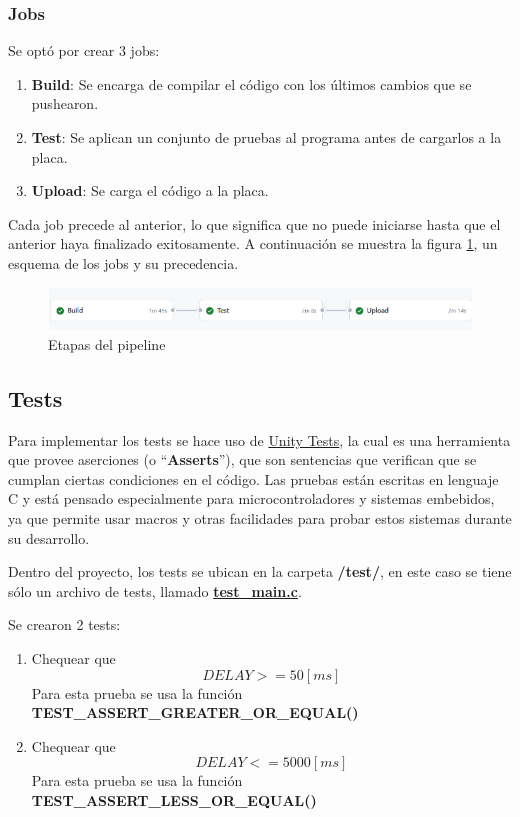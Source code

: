 \subsubsection{Jobs}
Se optó por crear 3 jobs:
\begin{enumerate}
\item \textbf{Build}: Se encarga de compilar el código con los últimos cambios que se pushearon.
\item \textbf{Test}: Se aplican un conjunto de pruebas al programa antes de cargarlos a la placa.
\item \textbf{Upload}: Se carga el código a la placa.
\end{enumerate}

Cada job precede al anterior, lo que significa que no puede iniciarse hasta que el anterior haya finalizado exitosamente. A continuación se muestra la figura \ref{fig:pipeline3}, un esquema de los jobs y su precedencia.

\begin{figure}[H]
    \centering
    \includegraphics[width=1\textwidth]{fig/pipeline_log.png}
    \caption{Etapas del pipeline}
    \label{fig:pipeline3}
\end{figure}
\subsection{Tests}
Para implementar los tests se hace uso de \href{http://www.throwtheswitch.org/unity}{Unity Tests}, la cual es una herramienta que provee aserciones (o ``\textbf{Asserts}''), que son sentencias que verifican que se cumplan ciertas condiciones en el código. Las pruebas están escritas en lenguaje C y está pensado especialmente para microcontroladores y sistemas embebidos, ya que permite usar macros y otras facilidades para probar estos sistemas durante su desarrollo.

Dentro del proyecto, los tests se ubican en la carpeta \textbf{/test/}, en este caso se tiene sólo un archivo de tests, llamado \href{https://github.com/FeedehC/pipeline-esp32/blob/main/test/test_main.c}{\textbf{test\_main.c}}.

Se crearon 2 tests:
\begin{enumerate}
\item Chequear que $$DELAY >= 50 [ms] $$
Para esta prueba se usa la función \textbf{TEST\_ASSERT\_GREATER\_OR\_EQUAL()}
\item Chequear que $$ DELAY <= 5000 [ms] $$
Para esta prueba se usa la función \textbf{TEST\_ASSERT\_LESS\_OR\_EQUAL()}
\end{enumerate}


